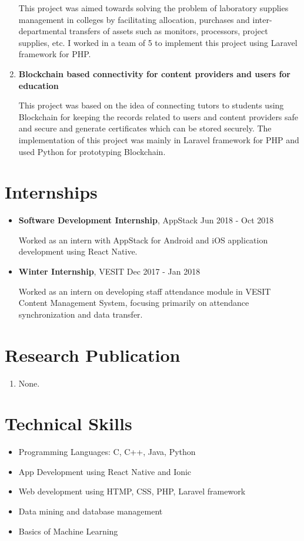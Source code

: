 \documentclass[margin]{res}
\begin{document}
\begin{resume}
\begin{enumerate}
  This project was aimed towards solving the problem of laboratory supplies management in colleges by facilitating allocation, purchases and inter-departmental transfers of assets such as monitors, processors, project supplies, etc. I worked in a team of 5 to implement this project using Laravel framework for PHP.
  \item {\bf Blockchain based connectivity for content providers and users for education}
  
  This project was based on the idea of connecting tutors to students using Blockchain for keeping the records related to users and content providers safe and secure and generate certificates which can be stored securely. The implementation of this project was mainly in Laravel framework for PHP and used Python for prototyping Blockchain. 
\end{enumerate}

  \section{Internships}
  \begin{itemize}
    \item {\bf Software Development Internship},  AppStack \hfill Jun 2018 - Oct 2018
    
    Worked as an intern with AppStack for Android and iOS application development using React Native. 
    \item {\bf Winter Internship}, VESIT \hfill Dec 2017 - Jan 2018
    
    Worked as an intern on developing staff attendance module in VESIT Content Management System, focusing primarily on 
    attendance synchronization and data transfer.
    
 \end{itemize}
 
\section{Research Publication}
\begin{enumerate}
  \item None. 
\end{enumerate}

\section{Technical Skills}
\begin{itemize}
  \item Programming Languages: C, C++, Java, Python
  \item App Development using React Native and Ionic
  \item Web development using HTMP, CSS, PHP, Laravel framework
  \item Data mining and database management
  \item Basics of Machine Learning
\end{itemize}


\end{resume}
\end{document}
